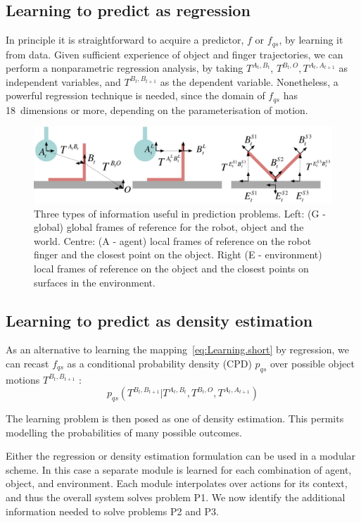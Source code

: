 \subsection{Learning to predict as regression} In principle it is straightforward to acquire a predictor, $f$ or
$f_{qs}$, by learning it from data. Given sufficient experience of
object and finger trajectories, we can perform a nonparametric
regression analysis, by taking $T^{A_t, B_t}$, $T^{B_t, O}, T^{A_{t},
  A_{t+1}}$ as independent variables, and $T^{B_{t}, B_{t+1}}$
as the dependent variable.  Nonetheless, a powerful regression
technique is needed, since the domain of $f_{qs}$ has 18~dimensions
or more, depending on the parameterisation of motion.
\begin{figure}[t]
\centerline{\includegraphics[width=\textwidth]{information}}
\caption{Three types of information useful in prediction problems. Left: (G - global) global frames of reference for the robot, object and the world. Centre: (A - agent) local frames of reference on the robot finger and the closest point on the object. Right (E - environment) local frames of reference on the object and the closest points on surfaces in the environment.}
\label{fig:Learning.setup2}
\end{figure}
\subsection{Learning to predict as density estimation} As an alternative to learning the mapping~\eqref{eq:Learning.short} by regression, we can recast $f_{qs}$ as a conditional probability density (CPD) $p_{qs}$ over possible object motions $T^{B_{t},B_{t+1}}$ \citep{kopicki_prediction_2009}:
\begin{equation}
p_{qs}(T^{B_{t}, B_{t+1}} | T^{A_t, B_t}, T^{B_t, O}, T^{A_{t}, A_{t+1}})
\label{eq:Learning.density1}
\end{equation}

The learning problem is then posed as one of density estimation. This permits modelling the probabilities of many possible outcomes. 

Either the regression or density estimation formulation can be used in a modular scheme. In this case a separate module is learned for each combination of agent, object, and environment. Each module interpolates over actions for its context, and thus the overall system solves problem P1. We now identify the additional information needed to solve problems P2 and P3.

